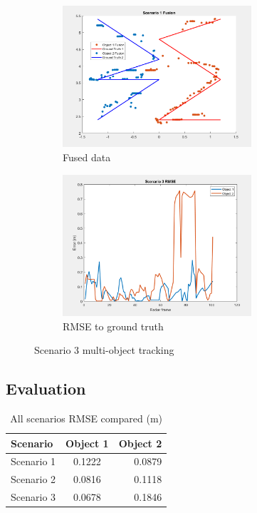 \begin{figure}[!htb]
    \begin{subfigure}[b]{0.475\textwidth}%
        \includegraphics[width=7cm]{Figures/fusion_scene3.png}
        \caption{Fused data}
        \label{subfig:with_fusion_3}
    \end{subfigure}
    \begin{subfigure}[b]{0.475\textwidth}%
        \includegraphics[width=7cm]{Figures/RMSE3.png}
        \caption{RMSE to ground truth}
        \label{subfig:RMSE_3}
    \end{subfigure}
    \caption{Scenario 3 multi-object tracking}
    \label{fig:scenario_result_3}
\end{figure}

\subsection{Evaluation}\label{sec:3-evaluation}
\begin{table}[h!]
    \begin{center}
      \label{tab:table2}
      \begin{tabular}{l|c|r} %
        \textbf{Scenario} & \textbf{Object 1} & \textbf{Object 2}\\
        \hline
        Scenario 1 & 0.1222  & 0.0879 \\
        Scenario 2 & 0.0816 & 0.1118\\
        Scenario 3 & 0.0678 & 0.1846\\
      \end{tabular}
    \end{center}
    \caption{All scenarios RMSE compared (m)}
    \label{tab:scenarios_rmse}
  \end{table}

